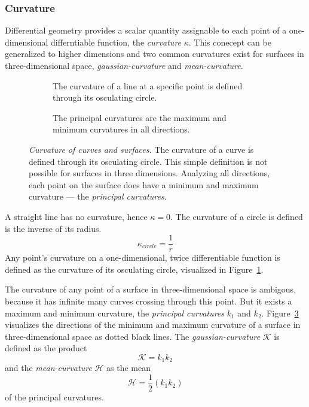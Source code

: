 \subsubsection{Curvature}

Differential geometry provides a scalar quantity\cite{Kuhnel2008} assignable to each point of a one-dimensional differntiable function, the \emph{curvature} $\kappa$.
This conecept can be generalized to higher dimensions and two common curvatures exist for surfaces in three-dimensional space, \emph{\gls{gaussian-curvature}} and \emph{\gls{mean-curvature}}.
\begin{figure}[H]
    \begin{subfigure}[t]{0.48\textwidth}
        \centering
        \scalebox{0.85}{%
        
        }
        \caption{The curvature of a line at a specific point is defined through its osculating circle.}\label{fig:osculating_circle}
    \end{subfigure}\hfill%
    \begin{subfigure}[t]{0.48\textwidth}
        \centering
        \scalebox{0.85}{%
        
        }
        \caption{The principal curvatures are the maximum and minimum curvatures in all directions.}\label{fig:curvature_surface}
    \end{subfigure}
    \caption[Curvature of curves and surfaces]{\emph{Curvature of curves and surfaces.} The curvature of a curve is defined through its osculating circle. This simple definition is not possible for surfaces in three dimensions. Analyzing all directions, each point on the surface does have a minimum and maximum curvature --- the \emph{principal curvatures}.}
\end{figure}
A straight line has no curvature, hence $\kappa = 0$.
The curvature of a circle is defined is the inverse of its radius.
\begin{equation}
    \kappa_{circle} = \frac{1}{r}
\end{equation}
Any point's curvature on a one-dimensional, twice differentiable function is defined as the curvature of its osculating circle, visualized in Figure~\ref{fig:osculating_circle}.

The curvature of any point of a surface in three-dimensional space is ambigous, because it has infinite many curves crossing through this point.
But it exists a maximum and minimum curvature, the \emph{principal curvatures} $k_1$ and $k_2$.
Figure~\ref{fig:curvature_surface} visualizes the directions of the minimum and maximum curvature of a surface in three-dimensional space as dotted black lines.
The \emph{\Gls{gaussian-curvature}} $\mathcal{K}$ is defined as the product
\[
    \mathcal{K} = k_1 k_2
\]
and the \emph{\Gls{mean-curvature}} $\mathcal{H}$ as the mean
\[
    \mathcal{H} = \frac{1}{2} (k_1 k_2)
\]
of the principal curvatures.

